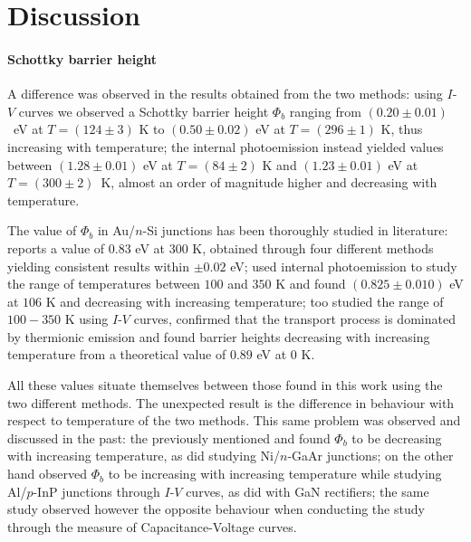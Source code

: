 \newpage

\section{Discussion}
\paragraph{Schottky barrier height} A difference was observed in the results obtained from the two me\-thods:
using $I$-$V$ curves we observed a Schottky barrier height $\Phi_b$ ranging from \mbox{$(0.20 \pm 0.01)$ eV} at $T = (124 \pm 3)$ K to $(0.50 \pm 0.02)$ eV at $T = (296 \pm 1)$ K, thus increasing with temperature; 
the internal photoemission instead yielded values between $(1.28 \pm 0.01)$ eV at $T = (84 \pm 2)$ K and $(1.23 \pm 0.01)$ eV at \mbox{$T = (300 \pm 2)$ K}, almost an order of magnitude higher and decreasing with temperature.

The value of $\Phi_b$ in Au/$n$-Si junctions has been thoroughly studied in literature: 
\cite{sze_physics_2007} reports a value of $0.83$ eV at 300 K, obtained through four different methods yielding consistent results within $\pm 0.02$ eV; 
\cite{crowell_equality_1964} used internal photoemission to study the range of temperatures between $100$ and $350$ K and found $(0.825 \pm 0.010)$ eV at $106$ K and decreasing with increasing temperature; 
\cite{arizumi_transport_1969} too studied the range {of} $100-350$ K using $I$-$V$ curves, confirmed that the transport process is dominated by thermionic emission and found barrier heights decreasing with increasing temperature from a theoretical value of $0.89$ eV at $0$ K.

All these values situate themselves between those found in this work using the two different methods. {The unexpected result} is the difference in behaviour with respect to temperature of the two methods.
This same problem was observed and discussed in the past:
the previously mentioned \cite{crowell_equality_1964} and \cite{arizumi_transport_1969} found $\Phi_b$ to be decreasing with increasing temperature, as did \cite{hackam_electrical_1972} studying Ni/$n$-GaAr junctions;
\cite{yildirim_temperature-dependent_2010} on the other hand observed $\Phi_b$ to be increasing with increasing temperature while studying Al/$p$-InP junctions through $I$-$V$ curves, as did \cite{zhou_temperature-dependent_2007} with GaN rectifiers; the same study observed however the opposite behaviour when conducting the study through the measure of Capacitance-Voltage curves.

